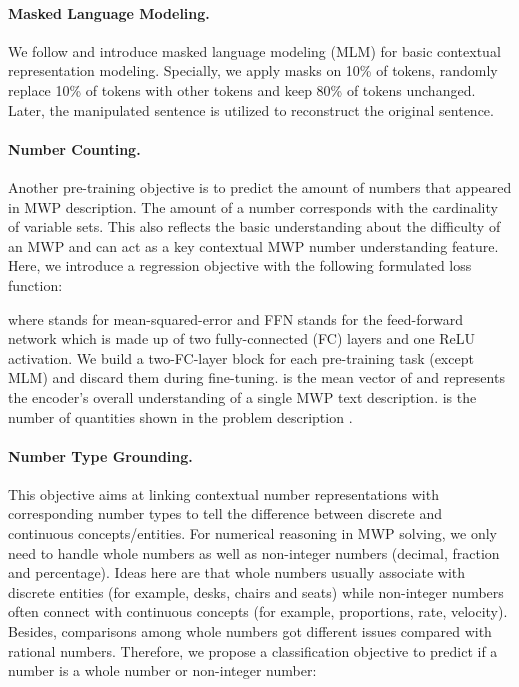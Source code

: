 \documentclass[11pt]{article}
\begin{document}
\paragraph{Masked Language Modeling.} We follow \citet{devlin2019bert} and introduce masked language modeling (MLM) for basic contextual representation modeling. Specially, we apply masks on 10\% of tokens, randomly replace 10\% of tokens with other tokens and keep 80\% of tokens unchanged. Later, the manipulated sentence is utilized to reconstruct the original sentence. 

\paragraph{Number Counting.} Another pre-training objective is to predict the amount of numbers that appeared in MWP description. The amount of a number corresponds with the cardinality of variable sets. This also reflects the basic understanding about the difficulty of an MWP and can act as a key contextual MWP number understanding feature. Here, we introduce a regression objective with the following formulated loss function:

where  stands for mean-squared-error and FFN stands for the feed-forward network which is made up of two fully-connected (FC) layers and one ReLU activation. We build a two-FC-layer block for each pre-training task (except MLM) and discard them during fine-tuning.  is the mean vector of  and represents the encoder's overall understanding of a single MWP text description.  is the number of quantities shown in the problem description . 

\paragraph{Number Type Grounding.} This objective aims at linking contextual number representations with corresponding number types to tell the difference between discrete and continuous concepts/entities. For numerical reasoning in MWP solving, we only need to handle whole numbers as well as non-integer numbers (decimal, fraction and percentage). Ideas here are that whole numbers usually associate with discrete entities (for example, desks, chairs and seats) while non-integer numbers often connect with continuous concepts (for example, proportions, rate, velocity). Besides, comparisons among whole numbers got different issues compared with rational numbers. Therefore, we propose a classification objective to predict if a number is a whole number or non-integer number:
\end{document}
